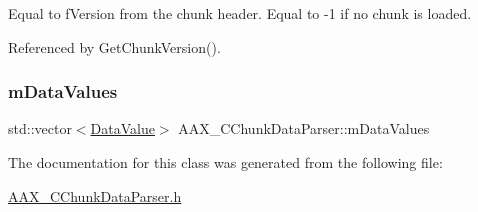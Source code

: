 Equal to f\+Version from the chunk header. Equal to -\/1 if no chunk is loaded. 



Referenced by Get\+Chunk\+Version().

\mbox{\label{a01461_af3963982859b42ddebdcaeba36dd1d29}} 
\subsubsection{\texorpdfstring{mDataValues}{mDataValues}}
{\footnotesize\ttfamily std\+::vector$<$\mbox{\hyperlink{a01465}{Data\+Value}}$>$ A\+A\+X\+\_\+\+C\+Chunk\+Data\+Parser\+::m\+Data\+Values}



The documentation for this class was generated from the following file\+:\begin{DoxyCompactItemize}
\item 
\mbox{\hyperlink{a00416}{A\+A\+X\+\_\+\+C\+Chunk\+Data\+Parser.\+h}}\end{DoxyCompactItemize}
